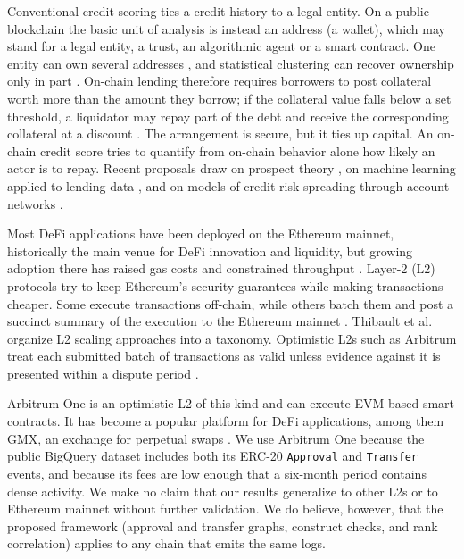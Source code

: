 
Conventional credit scoring ties a credit history to a legal entity. On a public blockchain the basic unit of analysis is instead an address (a wallet), which may stand for a legal entity, a trust, an algorithmic agent or a smart contract. One entity can own several addresses , and statistical clustering can recover ownership only in part . On-chain lending therefore requires borrowers to post collateral worth more than the amount they borrow; if the collateral value falls below a set threshold, a liquidator may repay part of the debt and receive the corresponding collateral at a discount . The arrangement is secure, but it ties up capital. An on-chain credit score tries to quantify from on-chain behavior alone how likely an actor is to repay. Recent proposals draw on prospect theory , on machine learning applied to lending data , and on models of credit risk spreading through account networks .


Most DeFi applications have been deployed on the Ethereum mainnet, historically the main venue for DeFi innovation and liquidity, but growing adoption there has raised gas costs and constrained throughput . Layer-2 (L2) protocols try to keep Ethereum's security guarantees while making transactions cheaper. Some execute transactions off-chain, while others batch them and post a succinct summary of the execution to the Ethereum mainnet . Thibault et al. organize L2 scaling approaches into a taxonomy. Optimistic L2s such as Arbitrum treat each submitted batch of transactions as valid unless evidence against it is presented within a dispute period .

Arbitrum One is an optimistic L2 of this kind and can execute EVM-based smart contracts. It has become a popular platform for DeFi applications, among them GMX, an exchange for perpetual swaps . We use Arbitrum One because the public BigQuery dataset includes both its ERC-20 \texttt{Approval} and \texttt{Transfer} events, and because its fees are low enough that a six-month period contains dense activity. We make no claim that our results generalize to other L2s or to Ethereum mainnet without further validation. We do believe, however, that the proposed framework (approval and transfer graphs, construct checks, and rank correlation) applies to any chain that emits the same logs.

